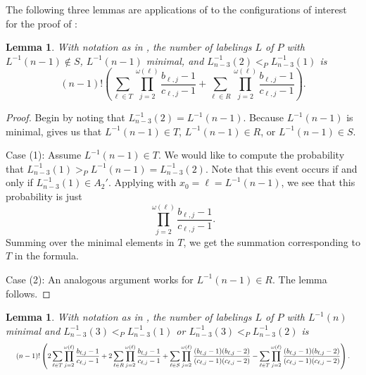 \documentclass[11pt]{amsart}
\newtheorem{lemma}[thm]{Lemma}
\theoremstyle{definition}
\newcommand{\inverse}{^{-1}}
\begin{document}
The following three lemmas are applications of  to the configurations of interest for the proof of :
\begin{lemma}\label{L^-1(n-1) minimal}
	With notation as in , the number of labelings $ L $ of $ P $ with $ L\inverse(n-1)\not\in S $, $ L\inverse(n-1) $ minimal, and $ L_{n-3}\inverse(2)<_PL_{n-3}\inverse(1) $ is \[(n-1)!\left(\sum_{\ell\in T}\prod_{j=2}^{\omega(\ell)}\frac{b_{\ell,j}-1}{c_{\ell,j}-1}+\sum_{\ell\in R}\prod_{j=2}^{\omega(\ell)}\frac{b_{\ell,j}-1}{c_{\ell,j}-1}\right).\]
\end{lemma}
\begin{proof}
	Begin by noting that $ L_{n-3}\inverse(2)=L\inverse(n-1) $. Because $ L\inverse(n-1) $ is minimal,  gives us that $ L\inverse(n-1)\in T $, $ L\inverse(n-1)\in R $, or $ L\inverse(n-1)\in S $. 
	
	Case (1): Assume $ L\inverse(n-1)\in T $. We would like to compute the probability that $ L_{n-3}\inverse(1)>_P L\inverse(n-1)=L_{n-3}\inverse(2) $. Note that this event occurs if and only if $ L_{n-3}\inverse(1)\in A_2' $. Applying  with $ x_0=\ell=L\inverse(n-1) $, we see that this probability is just \[\prod_{j=2}^{\omega(\ell)}\frac{b_{\ell,j}-1}{c_{\ell,j}-1}.\] Summing over the minimal elements in $ T $, we get the summation corresponding to $ T $ in the formula. 
	
	Case (2): An analogous argument works for $ L\inverse(n-1)\in R $. The lemma follows.
\end{proof}
\begin{lemma}\label{L^-1(n) minimal}
	With notation as in , the number of labelings $ L $ of $ P $ with $ L\inverse(n) $ minimal and $ L_{n-3}\inverse(3)<_PL_{n-3}\inverse(1) $ or $ L_{n-3}\inverse(3)<_PL_{n-3}\inverse(2) $ is \begin{equation*}
		\resizebox{\textwidth}{!} 
		{
			$(n-1)!\left(2\displaystyle\sum_{\ell\in T}\prod_{j=2}^{\omega(\ell)}\frac{b_{\ell,j}-1}{c_{\ell,j}-1}+2\sum_{\ell\in R}\prod_{j=2}^{\omega(\ell)}\frac{b_{\ell,j}-1}{c_{\ell,j}-1}\\
			+\sum_{\ell\in S}\prod_{j=2}^{\omega(\ell)}\frac{(b_{\ell,j}-1)(b_{\ell,j}-2)}{(c_{\ell,j}-1)(c_{\ell,j}-2)}-\sum_{\ell\in T}\prod_{j=2}^{\omega(\ell)}\frac{(b_{\ell,j}-1)(b_{\ell,j}-2)}{(c_{\ell,j}-1)(c_{\ell,j}-2)}\right).$
		}
	\end{equation*}
\end{lemma}
\end{document}
